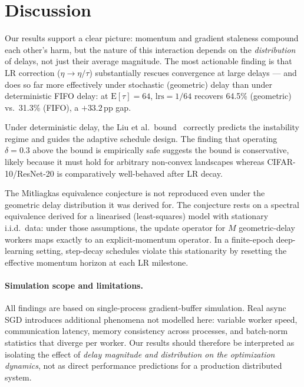 \documentclass[10pt,conference,compsocconf]{IEEEtran}
\begin{document}
\section{Discussion}

Our results support a clear picture: momentum and gradient staleness
compound each other's harm, but the nature of this interaction depends
on the \emph{distribution} of delays, not just their average magnitude.
The most actionable finding is that LR correction ($\eta \to \eta/\tau$)
substantially rescues convergence at large delays --- and does so far more
effectively under stochastic (geometric) delay than under deterministic
FIFO delay: at $\mathrm{E}[\tau]{=}64$, $\mathrm{lrs}{=}1/64$ recovers
64.5\% (geometric) vs.\ 31.3\% (FIFO), a $+33.2$\,pp gap.

Under deterministic delay, the Liu et al.\ bound~\cite{liu2018momentum}
correctly predicts the instability regime and guides the adaptive schedule
design.
The finding that operating $\delta{=}0.3$ above the bound is empirically
safe suggests the bound is conservative, likely because it must hold for
arbitrary non-convex landscapes whereas CIFAR-10/ResNet-20 is comparatively
well-behaved after LR decay.

The Mitliagkas equivalence conjecture is not reproduced even under the
geometric delay distribution it was derived for.
The conjecture rests on a spectral equivalence derived for a linearised
(least-squares) model with stationary i.i.d.\ data: under those assumptions,
the update operator for $M$ geometric-delay workers maps exactly to an
explicit-momentum operator.
In a finite-epoch deep-learning setting, step-decay schedules violate this
stationarity by resetting the effective momentum horizon at each LR milestone.

\paragraph{Simulation scope and limitations.}
All findings are based on single-process gradient-buffer simulation.
Real async SGD introduces additional phenomena not modelled here: variable
worker speed, communication latency, memory consistency across processes,
and batch-norm statistics that diverge per worker.
Our results should therefore be interpreted as isolating the effect of
\emph{delay magnitude and distribution on the optimization dynamics}, not
as direct performance predictions for a production distributed system.
\end{document}
